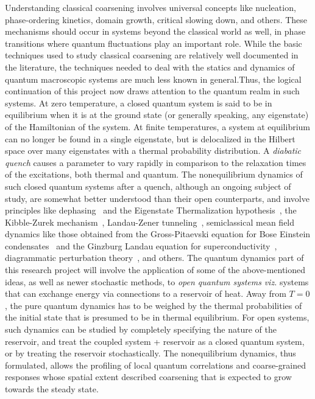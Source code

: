 \documentclass[a4paper,11pt,color]{article}
\begin{document}
Understanding classical coarsening involves universal concepts like nucleation, phase-ordering kinetics, domain growth, critical slowing down, and others. These mechanisms should occur in systems beyond the classical world as well, in phase transitions where quantum fluctuations play an important role. While the basic techniques used to study classical coarsening  are relatively well documented in the literature, the techniques needed to deal with the statics and dynamics of quantum macroscopic systems are much less known in general.Thus, the logical continuation of this project now draws attention to the quantum realm in such systems. At zero temperature, a closed quantum system is said to be in equilibrium when it is at the ground state (or generally speaking, any eigenstate) of the Hamiltonian of the system. At finite temperatures, a system at equilibrium can no longer be found in a single eigenstate, but is delocalized in the Hilbert space over many eigenstates with a thermal probability distribution. A \textit{diabatic quench} causes a  {parameter} to vary rapidly in comparison to the relaxation times of the excitations, both thermal and quantum. The nonequilibrium dynamics of such closed quantum systems after a quench, although an ongoing subject of study,  {are somewhat better understood than their open counterparts}, and involve principles like dephasing~\cite{thermalization} 
and the Eigenstate Thermalization hypothesis~\cite{thermalization,krishrev}, the Kibble-Zurek mechanism~\cite{bikashbabu}, Landau-Zener tunneling~\cite{bikashbabu}, semiclassical mean field dynamics like those obtained from the Gross-Pitaevski equation for Bose Einstein condensates~\cite{colrev} and the Ginzburg Landau equation for superconductivity~\cite{rammer}, diagrammatic perturbation theory~\cite{gorkov, volkov}, and others. The quantum dynamics part of this research project will involve the application of some of the above-mentioned ideas, as well as newer stochastic methods, to \textit{open quantum systems} \textit{viz.} systems that can exchange energy via connections to a reservoir of heat. Away from $T=0$, the pure quantum dynamics has to be weighed by the thermal probabilities of the initial state that is presumed to be in thermal equilibrium. For open systems, such dynamics can be studied by completely specifying the nature of the reservoir, and treat the coupled system + reservoir as a closed 
quantum system, or by treating the reservoir stochastically. The nonequilibrium dynamics, thus formulated, allows the profiling of local quantum correlations and coarse-grained responses whose 
spatial extent described coarsening that is expected to grow towards the steady state. 
\end{document}

